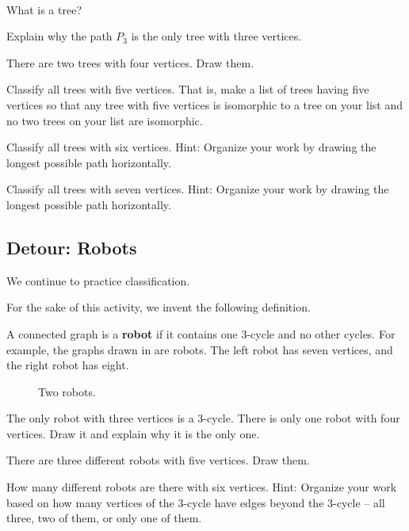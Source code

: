 \begin{act}
\label{act_classify_trees}
~
    \begin{actpart}
        \item What is a tree?
        \item Explain why the path $P_3$ is the only tree with three vertices.
        \item There are two trees with four vertices. Draw them.
        \item Classify all trees with five vertices.  That is, make a list of trees having five vertices so that any tree with five vertices is isomorphic to a tree on your list and no two trees on your list are isomorphic.
        \item \label{part_trees_order6} Classify all trees with six vertices. Hint: Organize your work by drawing the longest possible path horizontally.
        \item \label{part_trees_order7} Classify all trees with seven vertices. Hint: Organize your work by drawing the longest possible path horizontally.
    \end{actpart}
\end{act}


\newcommand{\subrobots}{Detour: Robots}
\subsection{\subrobots}
\label{sub_robots}

We continue to practice classification.  
\begin{act}[Robots]
\label{act_robots}
    For the sake of this activity, we invent the following definition.
        \begin{defn}[Robot]
        \label{defn_robot}
            A connected graph is a \textbf{robot} if it contains one 3-cycle and no other cycles.  For example, the graphs drawn in  are robots.  The left robot has seven vertices, and the right robot has eight.  
                \begin{figure}[hbtp]
                    \centering
                    
                    \caption{Two robots.}
                    \label{fig_robots}
                \end{figure}
        \end{defn}
    \begin{actpart}
        \item The only robot with three vertices is a 3-cycle.  There is only one robot with four vertices.  Draw it and explain why it is the only one.
        \item There are three different robots with five vertices.  Draw them.
        \item How many different robots are there with six vertices. Hint: Organize your work based on how many vertices of the 3-cycle have edges beyond the 3-cycle -- all three, two of them, or only one of them.
    \end{actpart}
\end{act}

